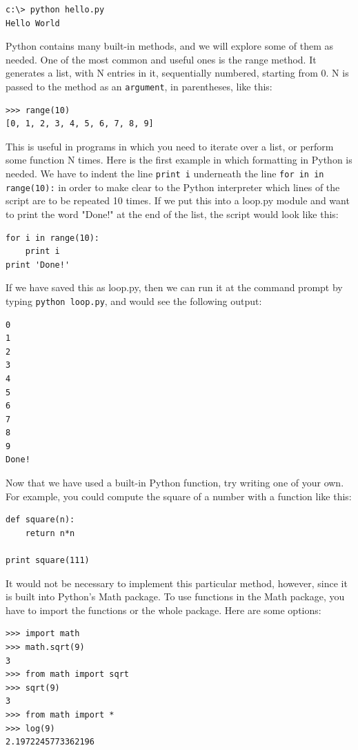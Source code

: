 \begin{verbatim}
c:\> python hello.py
Hello World
\end{verbatim}

Python contains many built-in methods, and we will explore some of them as needed.  One of the most common and useful ones is the range method.  It generates a list, with N entries in it, sequentially numbered, starting from 0.  N is passed to the method as an \verb#argument#, in parentheses, like this:

\begin{verbatim}
>>> range(10)
[0, 1, 2, 3, 4, 5, 6, 7, 8, 9]
\end{verbatim}

This is useful in programs in which you need to iterate over a list, or perform some function N times.  Here is the first example in which formatting in Python is needed.  We have to indent the line \verb#print i# underneath the line \verb#for in in range(10):# in order to make clear to the Python interpreter which lines of the script are to be repeated 10 times.  If we put this into a loop.py module and want to print the word "Done!" at the end of the list, the script would look like this:

\begin{verbatim}
for i in range(10):
    print i
print 'Done!'
\end{verbatim}

If we have saved this as loop.py, then we can run it at the command prompt by typing \verb#python loop.py#, and would see the following output:

\begin{verbatim}
0
1
2
3
4
5
6
7
8
9
Done!
\end{verbatim}



Now that we have used a built-in Python function, try writing one of your own.  For example, you could compute the square of a number with a function like this:

\begin{verbatim}
def square(n):
    return n*n

print square(111)
\end{verbatim}

It would not be necessary to implement this particular method, however, since it is built into Python's Math package.  To use functions in the Math package, you have to import the functions or the whole package.  Here are some options:

\begin{verbatim}
>>> import math
>>> math.sqrt(9)
3
>>> from math import sqrt
>>> sqrt(9)
3
>>> from math import *
>>> log(9)
2.1972245773362196
\end{verbatim}

